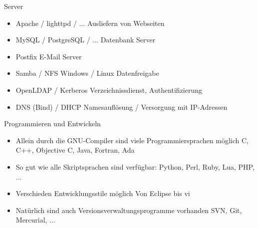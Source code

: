 \documentclass[aspectratio=43]{beamer}
\begin{document}
\begin{frame} 

	\begin{block}{Server} 
	\begin{itemize}
	\item Apache / lighttpd / ...
	\newline Ausliefern von Webseiten
	\item MySQL / PostgreSQL / ...
	\newline Datenbank Server
	\item Postfix
	\newline E-Mail Server
	\item Samba / NFS
	\newline Windows / Linux Datenfreigabe
	\item OpenLDAP / Kerberos
	\newline Verzeichnissdienst, Authentifizierung
	\item DNS (Bind) / DHCP
	\newline Namesauflösung / Versorgung mit IP-Adressen
	\end{itemize}

	\end{block}
	
\end{frame}

\begin{frame} 

	\begin{block}{Programmieren und Entwickeln} 
	\begin{itemize}
	\item Allein durch die GNU-Compiler sind viele Programmiersprachen möglich
	\newline C, C++, Objective C, Java, Fortran, Ada
	\item So gut wie alle Skriptsprachen sind verfügbar:
	\newline Python, Perl, Ruby, Lua, PHP, ...
	\item Verschieden Entwicklungsstile möglich
	\newline Von Eclipse bis vi
	\item Natürlich sind auch Versionsverwaltungsprogramme vorhanden
	\newline SVN, Git, Mercurial, ...
	\end{itemize}

	\end{block}
	
\end{frame}
\end{document}
